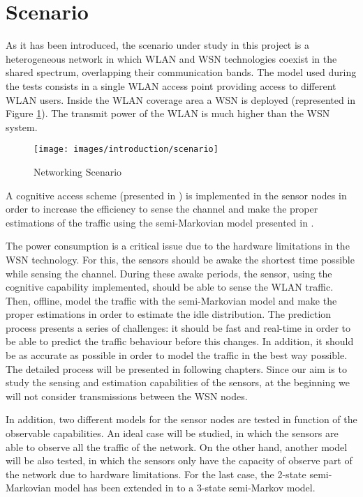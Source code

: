\section{Scenario} \label{sec:intro_scenario}
As it has been introduced, the scenario under study in this project is a heterogeneous network in which \acs{WLAN} and \acs{WSN} technologies coexist in the shared spectrum, overlapping their communication bands. The model used during the tests consists in a single \acs{WLAN} access point providing access to different \acs{WLAN} users. Inside the \acs{WLAN} coverage area a \acs{WSN} is deployed (represented in Figure \ref{fig:scenario}). The transmit power of the \acs{WLAN} is much higher than the \acs{WSN} system.

\begin{figure}
	\centering
	\texttt{[image: images/introduction/scenario]}
	\caption{Networking Scenario}
	\label{fig:scenario}
\end{figure}

A cognitive access scheme (presented in \cite{ioannis}) is implemented in the sensor nodes in order to increase the efficiency to sense the channel and make the proper estimations of the traffic using the semi-Markovian model presented in \cite{DSA-Emp}.

The power consumption is a critical issue due to the hardware limitations in the \acs{WSN} technology. For this, the sensors should be awake the shortest time possible while sensing the channel. During these awake periods, the sensor, using the cognitive capability implemented, should be able to sense the \acs{WLAN} traffic. Then, offline, model the traffic with the semi-Markovian model and make the proper estimations in order to estimate the idle distribution. The prediction process presents a series of challenges: it should be fast and real-time in order to be able to predict the traffic behaviour before this changes. In addition, it should be as accurate as possible in order to model the traffic in the best way possible. The detailed process will be presented in following chapters. Since our aim is to study the sensing and estimation capabilities of the sensors, at the beginning we will not consider transmissions between the \acs{WSN} nodes.

In addition, two different models for the sensor nodes are tested in function of the observable capabilities. An ideal case will be studied, in which the sensors are able to observe all the traffic of the network. On the other hand, another model will be also tested, in which the sensors only have the capacity of observe part of the network due to hardware limitations. For the last case, the 2-state semi-Markovian model has been extended in \cite{marcello} to a 3-state semi-Markov model.

